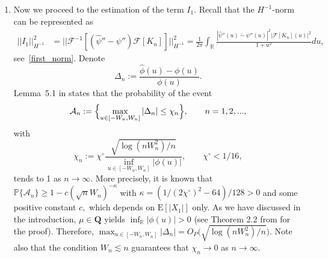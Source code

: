 \documentclass[numbers,webpdf,imaiai]{ima-authoring-template}%
\theoremstyle{thmstyletwo}%
\newcommand{\R}{\mathbb{R}}
\newcommand{\F}{\mathcal{F}}
\newcommand{\E}{\mathrm{E}}
\newcommand{\A}{\mathcal{A}}
\renewcommand{\P}{\mathbb{P}}
\newcommand{\Q}{\pmb{Q}}
\numberwithin{equation}{section}
\begin{document}
\begin{enumerate}
\item Now we proceed to the estimation of the term $I_1$. Recall that the \(H^{-1}\)-norm can be represented as
\begin{align}\label{H-1}
    ||I_1||^2_{H^{-1}} &= ||\F^{-1}[(\widehat{\psi}'' - \psi'')\F[K_n]]||^2_{H^{-1}} 
    = \frac{1}{2\pi} \int_{\R} \frac{|\widehat{\psi}''(u) - \psi''(u)|^2 |\F[K_n](u)|^2}{1 + u^2} du,
    \end{align}
  see~\eqref{first_norm}.   Denote \begin{equation*}
    \Delta_n := \frac{\widehat{\phi}(u) - \phi(u)}{\phi(u)}.
\end{equation*}
Lemma~5.1 in \citep{PanovRyabchenko2026} states that the probability of the event 
\begin{equation*}
    \mathcal{A}_n := \Bigl\{\max_{u \in [-W_n,W_n]} |\Delta_n| \leq \chi_n \Bigr\}, \qquad n=1,2,...,
\end{equation*}
with \[\chi_n := \chi^\circ \frac{\sqrt{\log(nW_n^2)/ n}}{\inf_{u \in [-W_n, W_n]}|\phi(u)|}, \qquad \chi^\circ<1/16,\]
tends to 1 as \(n \to \infty.\) More precisely, it is known that 
 \(\P\{\A_n\} \geq 1-c (\sqrt{n}W_n)^{-\kappa}\) with \(\kappa= (1/(2\chi^\circ)^2-64) / 128>0\) and some positive constant \(c,\) which  depends on \(\E[|X_1|]\) only. As we have discussed in the introduction, \(\mu \in \Q\) yields $\inf_{\R}|\phi(u)|  >0$ (see Theorem 2.2 from \cite{BK2023} for the proof). Therefore, \(\max_{u \in [-W_n,W_n]} |\Delta_n| = O_P\bigl(\sqrt{\log(nW_n^2)/ n}\bigr).\) Note also that the condition \(W_n \lesssim n\) guarantees that \(\chi_n \to 0\) as \(n \to \infty.\)
 

\end{enumerate}
\end{document}

